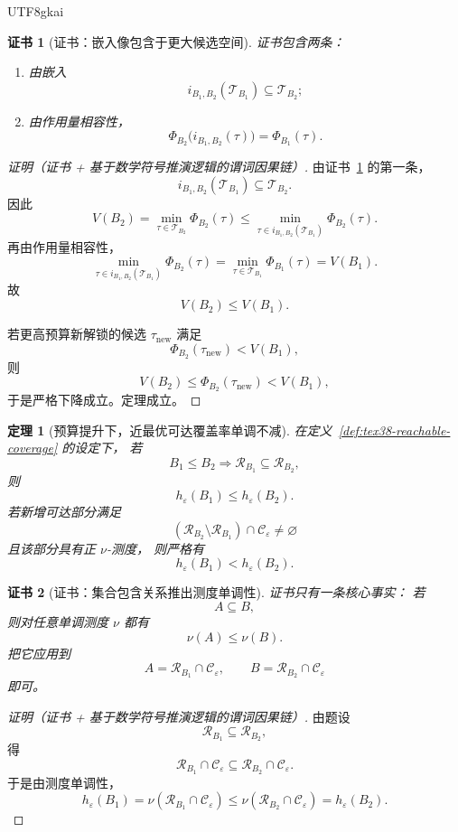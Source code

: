 \documentclass[12pt]{article}
\newtheorem{theorem}{定理}[section]
\newtheorem{Certificate}{证书}[section]
\begin{document}
\begin{CJK*}{UTF8}{gkai}
\begin{Certificate}[证书：嵌入像包含于更大候选空间]
\label{cert:tex38-budget-value}
证书包含两条：
\begin{enumerate}
  \item 由嵌入
  \[
    i_{B_1,B_2}(\mathcal T_{B_1})\subseteq\mathcal T_{B_2};
  \]
  \item 由作用量相容性，
  \[
    \Phi_{B_2}\bigl(i_{B_1,B_2}(\tau)\bigr)=\Phi_{B_1}(\tau).
  \]
\end{enumerate}
\end{Certificate}

\begin{proof}[证明（证书 + 基于数学符号推演逻辑的谓词因果链）]
由证书~\ref{cert:tex38-budget-value} 的第一条，
\[
  i_{B_1,B_2}(\mathcal T_{B_1})\subseteq\mathcal T_{B_2}.
\]
因此
\[
  V(B_2)
  =
  \min_{\tau\in\mathcal T_{B_2}}\Phi_{B_2}(\tau)
  \le
  \min_{\tau\in i_{B_1,B_2}(\mathcal T_{B_1})}\Phi_{B_2}(\tau).
\]
再由作用量相容性，
\[
  \min_{\tau\in i_{B_1,B_2}(\mathcal T_{B_1})}\Phi_{B_2}(\tau)
  =
  \min_{\tau\in\mathcal T_{B_1}}\Phi_{B_1}(\tau)
  =
  V(B_1).
\]
故
\[
  V(B_2)\le V(B_1).
\]

若更高预算新解锁的候选 $\tau_{\mathrm{new}}$ 满足
\[
  \Phi_{B_2}(\tau_{\mathrm{new}})<V(B_1),
\]
则
\[
  V(B_2)\le\Phi_{B_2}(\tau_{\mathrm{new}})<V(B_1),
\]
于是严格下降成立。定理成立。
\end{proof}

\begin{theorem}[预算提升下，近最优可达覆盖率单调不减]
\label{thm:tex38-budget-coverage}
在定义~\ref{def:tex38-reachable-coverage} 的设定下，
若
\[
  B_1\le B_2
  \Longrightarrow
  \mathcal R_{B_1}\subseteq \mathcal R_{B_2},
\]
则
\[
  h_\varepsilon(B_1)\le h_\varepsilon(B_2).
\]
若新增可达部分满足
\[
  (\mathcal R_{B_2}\setminus\mathcal R_{B_1})\cap\mathcal C_\varepsilon\neq\varnothing
\]
且该部分具有正 $\nu$-测度，
则严格有
\[
  h_\varepsilon(B_1)<h_\varepsilon(B_2).
\]
\end{theorem}

\begin{Certificate}[证书：集合包含关系推出测度单调性]
\label{cert:tex38-budget-coverage}
证书只有一条核心事实：
若
\[
  A\subseteq B,
\]
则对任意单调测度 $\nu$ 都有
\[
  \nu(A)\le \nu(B).
\]
把它应用到
\[
  A=\mathcal R_{B_1}\cap\mathcal C_\varepsilon,
  \qquad
  B=\mathcal R_{B_2}\cap\mathcal C_\varepsilon
\]
即可。
\end{Certificate}

\begin{proof}[证明（证书 + 基于数学符号推演逻辑的谓词因果链）]
由题设
\[
  \mathcal R_{B_1}\subseteq \mathcal R_{B_2},
\]
得
\[
  \mathcal R_{B_1}\cap\mathcal C_\varepsilon
  \subseteq
  \mathcal R_{B_2}\cap\mathcal C_\varepsilon.
\]
于是由测度单调性，
\[
  h_\varepsilon(B_1)
  =
  \nu(\mathcal R_{B_1}\cap\mathcal C_\varepsilon)
  \le
  \nu(\mathcal R_{B_2}\cap\mathcal C_\varepsilon)
  =
  h_\varepsilon(B_2).
\]


\end{proof}
\end{CJK*}
\end{document}
